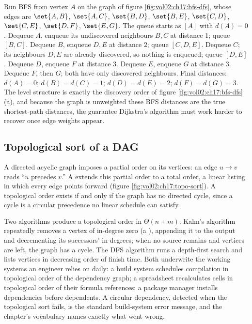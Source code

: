 Run BFS from vertex $A$ on the graph of figure
\ref{fig:vol02:ch17:bfs-dfs}, whose edges are $\set{A,B}$,
$\set{A,C}$, $\set{B,D}$, $\set{B,E}$, $\set{C,D}$, $\set{C,E}$,
$\set{D,F}$, $\set{E,G}$. The queue starts as $[A]$ with $d(A) = 0$.
Dequeue $A$, enqueue its undiscovered neighbours $B, C$ at distance
$1$; queue $[B, C]$. Dequeue $B$, enqueue $D, E$ at distance $2$;
queue $[C, D, E]$. Dequeue $C$; its neighbours $D, E$ are already
discovered, so nothing is enqueued; queue $[D, E]$. Dequeue $D$,
enqueue $F$ at distance $3$. Dequeue $E$, enqueue $G$ at distance
$3$. Dequeue $F$, then $G$; both have only discovered neighbours.
Final distances: $d(A) = 0$; $d(B) = d(C) = 1$; $d(D) = d(E) = 2$;
$d(F) = d(G) = 3$. The level structure is exactly the discovery
order of figure \ref{fig:vol02:ch17:bfs-dfs}(a), and because the
graph is unweighted these BFS distances are the true shortest-path
distances, the guarantee Dijkstra's algorithm must work harder to
recover once edge weights appear.

\subsection{Topological sort of a DAG}

A directed acyclic graph imposes a partial order on its vertices: an
edge $u \to v$ reads ``$u$ precedes $v$.'' A  extends this partial order to a total order, a linear listing
in which every edge points forward (figure
\ref{fig:vol02:ch17:topo-sort}). A topological order exists if and
only if the graph has no directed cycle, since a cycle is a circular
precedence no linear schedule can satisfy.



Two algorithms produce a topological order in $\Theta(n + m)$.
Kahn's algorithm repeatedly removes a vertex of in-degree zero (a
), appending it to the output and decrementing its
successors' in-degrees; when no source remains and vertices are
left, the graph has a cycle. The DFS algorithm runs a depth-first
search and lists vertices in decreasing order of finish time. Both
underwrite the working systems an engineer relies on daily: a build
system schedules compilation in topological order of the dependency
graph; a spreadsheet recalculates cells in topological order of
their formula references; a package manager installs dependencies
before dependents. A circular dependency, detected when the
topological sort fails, is the standard build-system error message,
and the chapter's vocabulary names exactly what went wrong.

